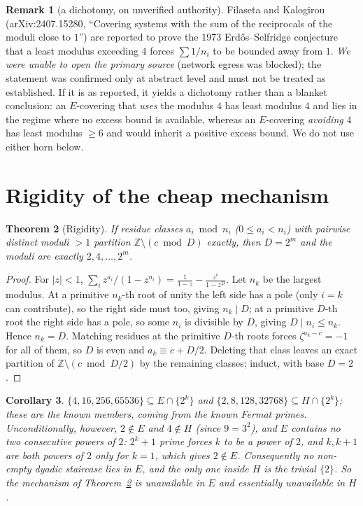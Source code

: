 \documentclass[11pt]{article}
\newtheorem{theorem}{Theorem}
\newtheorem{corollary}[theorem]{Corollary}
\theoremstyle{definition}
\newtheorem{remark}[theorem]{Remark}
\begin{document}
\begin{remark}[a dichotomy, on unverified authority]\label{rem:FK}
Filaseta and Kalogirou (arXiv:2407.15280, ``Covering systems with the sum of the reciprocals of the
moduli close to $1$'') are reported to prove the 1973 Erd\H{o}s--Selfridge conjecture that a least
modulus exceeding $4$ forces $\sum 1/n_i$ to be bounded away from $1$. \emph{We were unable to
open the primary source} (network egress was blocked); the statement was confirmed only at
abstract level and must not be treated as established. If it is as reported, it yields a
dichotomy rather than a blanket conclusion: an $E$-covering that \emph{uses} the modulus $4$ has
least modulus $4$ and lies in the regime where no excess bound is available, whereas an
$E$-covering \emph{avoiding} $4$ has least modulus $\ge 6$ and would inherit a positive excess
bound. We do not use either horn below.
\end{remark}

\section{Rigidity of the cheap mechanism}

\begin{theorem}[Rigidity]\label{thm:rigid}
If residue classes $a_i\bmod n_i$ ($0\le a_i<n_i$) with pairwise distinct moduli $>1$ partition
$\mathbb Z\setminus(c\bmod D)$ exactly, then $D=2^m$ and the moduli are exactly $2,4,\dots,2^m$.
\end{theorem}

\begin{proof}[Proof]
For $|z|<1$, $\sum_i z^{a_i}/(1-z^{n_i})=\frac1{1-z}-\frac{z^{c}}{1-z^{D}}$. Let $n_k$ be the
largest modulus. At a primitive $n_k$-th root of unity the left side has a pole (only $i=k$ can
contribute), so the right side must too, giving $n_k\mid D$; at a primitive $D$-th root the right
side has a pole, so some $n_i$ is divisible by $D$, giving $D\mid n_i\le n_k$. Hence $n_k=D$.
Matching residues at the primitive $D$-th roots forces $\zeta^{a_k-c}=-1$ for all of them, so $D$
is even and $a_k\equiv c+D/2$. Deleting that class leaves an exact partition of
$\mathbb Z\setminus(c\bmod D/2)$ by the remaining classes; induct, with base $D=2$.
\end{proof}

\begin{corollary}\label{cor:rigid}
$\{4,16,256,65536\}\subseteq E\cap\{2^k\}$ and $\{2,8,128,32768\}\subseteq H\cap\{2^k\}$; these are
the known members, coming from the known Fermat primes. Unconditionally, however,
$2\notin E$ and $4\notin H$ (since $9=3^2$), and $E$ contains no two consecutive powers of $2$:
$2^k+1$ prime forces $k$ to be a power of $2$, and $k,k+1$ are both powers of $2$ only for $k=1$,
which gives $2\notin E$. Consequently \emph{no} non-empty dyadic staircase lies in $E$, and the
only one inside $H$ is the trivial $\{2\}$. So the mechanism of Theorem~\ref{thm:rigid} is
unavailable in $E$ and essentially unavailable in $H$.
\end{corollary}
\end{document}
